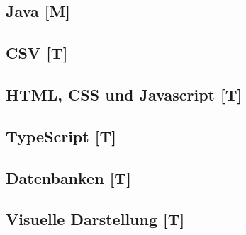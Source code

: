 

\begin{spacing}{1}
    \section{Java [M]}\label{section:allTechJava}
    \end{spacing}


\begin{spacing}{1}
    \section{CSV [T]}\label{section:allTechCSV}
    \end{spacing}


\begin{spacing}{1}
    \section{HTML, CSS und Javascript [T]}\label{section:allTechHTMLCSS}
    \end{spacing}

 
\begin{spacing}{1}
    \section{TypeScript [T]}\label{section:allTechTypescript}
    \end{spacing}

 
\begin{spacing}{1}
    \section{Datenbanken [T]}\label{section:database}
    \end{spacing}


\begin{spacing}{1}
    \section{Visuelle Darstellung [T]}\label{section:gui}
    \end{spacing}


